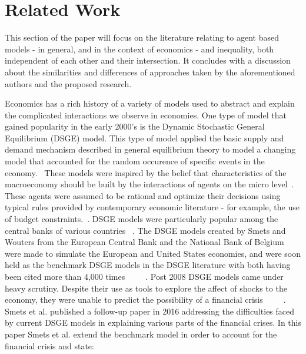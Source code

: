 \documentclass[11pt]{article}
\begin{document}
\section{Related Work}
\label{sec:relatedwork}

This section of the paper will focus on the literature relating to agent based
models - in general, and in the context of economics - and inequality, both
independent of each other and their intersection. It concludes with a discussion
about the similarities and differences of approaches taken by the aforementioned
authors and the proposed research.

Economics has a rich history of a variety of models used to abstract and explain
the complicated interactions we observe in economies. One type of model that
gained popularity in the early 2000’s is the Dynamic Stochastic General Equilibrium
(DSGE) model. This type of model applied the basic supply and demand mechanism
described in general equilibrium theory to model a changing model that accounted
for the random occurence of specific events in the economy.~\cite{Haldane-history-paper}
These models were inspired by the belief that characteristics of the macroeconomy
should be built by the interactions of agents on the micro level~\cite{Haldane-history-paper}.
These agents were assumed to be rational and optimize their decisions using typical
rules provided by contemporary economic literature - for example, the use of
budget constraints.~\cite{Haldane-history-paper}. DSGE models were particularly
 popular among the central banks of various countries ~\cite{Smets-challenges-paper}.
 The DSGE models created by Smets and Wouters from the European Central Bank and
 the National Bank of Belgium were made to simulate the European and United States
 economies, and were soon held as the benchmark DSGE models in the DSGE literature
 with both having been cited more than 4,000 times ~\cite{Smets-euro-paper} ~\cite{Smets-us-paper} ~\cite{Smets-challenges-paper}.
  Post 2008 DSGE models came under heavy scrutiny. Despite their use as tools to
  explore the affect of shocks to the economy, they were unable to predict the
  possibility of a financial crisis ~\cite{Smets-euro-paper} ~\cite{Smets-us-paper} ~\cite{Smets-challenges-paper}.
  Smets et al. published a follow-up paper in 2016 addressing the difficulties
   faced by current DSGE models in explaining various parts of the financial crises.
   In this paper Smets et al. extend the benchmark model in order to account
   for the financial crisis and state:
\end{document}
